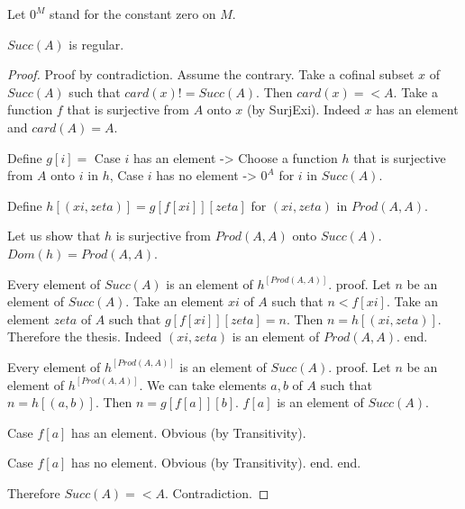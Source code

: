 \documentclass{article}
\begin{document}
\begin{forthel}
    Let $0^M$ stand for the constant zero on $M$.

    \begin{theorem}
      $Succ(A)$ is regular.
    \end{theorem}
    \begin{proof}
      Proof by contradiction. Assume the contrary. Take a cofinal subset $x$ of
      $Succ(A)$ such that $card(x) != Succ(A)$. Then $card(x) =< A$. Take a function $f$ that is surjective from $A$ onto $x$ (by SurjExi). Indeed $x$ has an element and $card(A) = A$.

      Define $g[i] =$
        Case $i$ has an element -> Choose a function $h$ that is surjective from $A$ onto $i$ in $h$,
        Case $i$ has no element -> $0^A$
      for $i$ in $Succ(A)$.

      Define $h[(xi,zeta)] = g[f[xi]][zeta]$ for $(xi,zeta)$ in $Prod(A,A)$.

      Let us show that $h$ is surjective from $Prod(A,A)$ onto $Succ(A)$. $Dom(h) = Prod(A,A)$.

        Every element of $Succ(A)$ is an element of $h^[Prod(A,A)]$.
        proof.
          Let $n$ be an element of $Succ(A)$. Take an element $xi$ of $A$ such that $n < f[xi]$. Take an element $zeta$ of $A$ such that $g[f[xi]][zeta] = n$. Then $n = h[(xi,zeta)]$. Therefore the thesis. Indeed $(xi,zeta)$ is an element of $Prod(A,A)$.
        end.

        Every element of $h^[Prod(A,A)]$ is an element of $Succ(A)$.
        proof.
          Let $n$ be an element of $h^[Prod(A,A)]$. We can take elements $a,b$ of $A$ such that $n = h[(a,b)]$. Then $n = g[f[a]][b]$. $f[a]$ is an element of $Succ(A)$.

          Case $f[a]$ has an element. Obvious (by Transitivity).

          Case $f[a]$ has no element. Obvious (by Transitivity).
        end.
      end.

      Therefore $Succ(A) =< A$. Contradiction.
    \end{proof}
  \end{forthel}
\end{document}
